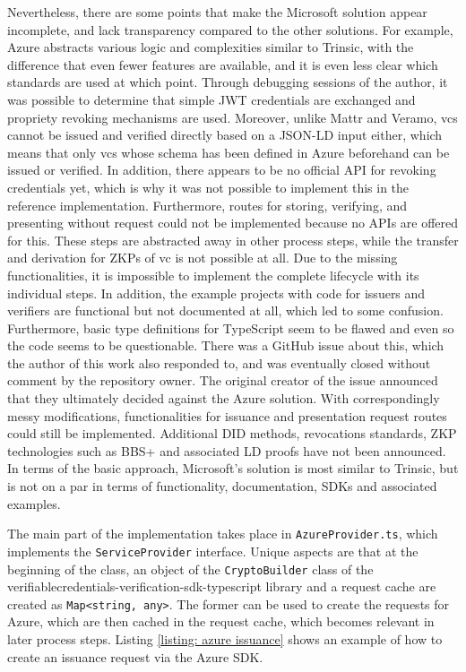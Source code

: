         Nevertheless, there are some points that make the Microsoft solution appear incomplete, and lack transparency compared to the other solutions. For example, Azure abstracts various logic and complexities similar to Trinsic, with the difference that even fewer features are available, and it is even less clear which standards are used at which point. Through debugging sessions of the author, it was possible to determine that simple JWT credentials are exchanged and propriety revoking mechanisms are used. Moreover, unlike Mattr and Veramo, \acp{vc} cannot be issued and verified directly based on a JSON-LD input either, which means that only \acp{vc} whose schema has been defined in Azure beforehand can be issued or verified. In addition, there appears to be no official API for revoking credentials yet, which is why it was not possible to implement this in the reference implementation. Furthermore, routes for storing, verifying, and presenting without request could not be implemented because no APIs are offered for this. These steps are abstracted away in other process steps, while the transfer and derivation for \acp{ZKP} of \ac{vc} is not possible at all. Due to the missing functionalities, it is impossible to implement the complete lifecycle with its individual steps. In addition, the example projects with code for issuers and verifiers are functional but not documented at all, which led to some confusion. Furthermore, basic type definitions for TypeScript seem to be flawed and even so the code seems to be questionable. There was a GitHub issue \cite{yegupov_demo_2021} about this, which the author of this work also responded to, and was eventually closed without comment by the repository owner. The original creator of the issue announced that they ultimately decided against the Azure solution. With correspondingly messy modifications, functionalities for issuance and presentation request routes could still be implemented. Additional \ac{DID} methods, revocations standards, \ac{ZKP} technologies such as BBS+ and associated LD proofs have not been announced. In terms of the basic approach, Microsoft's solution is most similar to Trinsic, but is not on a par in terms of functionality, documentation, SDKs and associated examples.

        The main part of the implementation takes place in \texttt{AzureProvider.ts}, which implements the \texttt{ServiceProvider} interface. Unique aspects are that at the beginning of the class, an object of the \texttt{CryptoBuilder} class of the verifiablecredentials-verification-sdk-typescript library and a request cache are created as \texttt{Map<string, any>}. The former can be used to create the requests for Azure, which are then cached in the request cache, which becomes relevant in later process steps. Listing \ref{listing: azure issuance} shows an example of how to create an issuance request via the Azure SDK.
        \newline
        
